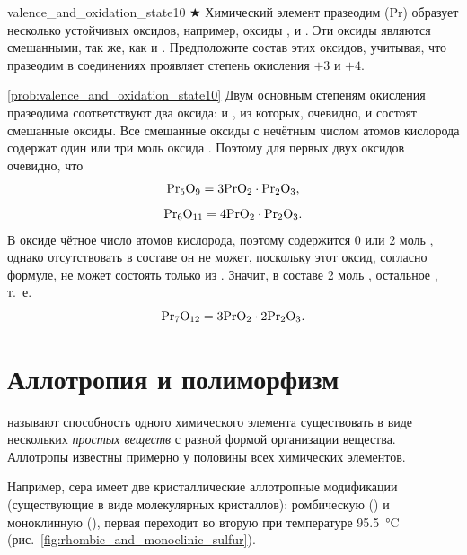 \begin{problem}{}{valence_and_oxidation_state10}
    $\bigstar$ Химический элемент празеодим (Pr) образует несколько устойчивых оксидов, например, оксиды ,  и . Эти оксиды являются смешанными, так же, как и . Предположите состав этих оксидов, учитывая, что празеодим в соединениях проявляет степень окисления $+3$ и $+4$.
    \begin{sol}{\ref{prob:valence_and_oxidation_state10}}
        Двум основным степеням окисления празеодима соответствуют два оксида:  и , из которых, очевидно, и состоят смешанные оксиды. Все смешанные оксиды с нечётным числом атомов кислорода содержат один или три моль оксида . Поэтому для первых двух оксидов очевидно, что
        \begin{equation*}
            \ce{Pr5O9} = 3\ce{PrO2} \cdot \ce{Pr2O3},
        \end{equation*}
        \begin{equation*}
            \ce{Pr6O11} = 4\ce{PrO2} \cdot \ce{Pr2O3}.
        \end{equation*}
        В оксиде  чётное число атомов кислорода, поэтому содержится 0 или 2 моль , однако отсутствовать в составе он не может, поскольку этот оксид, согласно формуле, не может состоять только из . Значит, в составе 2 моль , остальное , т.~е.
        \begin{equation*}
            \ce{Pr7O12} = 3\ce{PrO2} \cdot 2\ce{Pr2O3}.
        \end{equation*}
    \end{sol}
\end{problem}

\clearpage

\section{Аллотропия и полиморфизм}

 называют способность одного химического элемента существовать в виде нескольких \emph{простых веществ} с разной формой организации вещества. Аллотропы известны примерно у половины всех химических элементов.

Например, сера имеет две кристаллические аллотропные модификации (существующие в виде молекулярных кристаллов): ромбическую () и моноклинную (), первая переходит во вторую при температуре \qty{95,5}{\degreeCelsius} (рис.~\ref{fig:rhombic_and_monoclinic_sulfur}).

